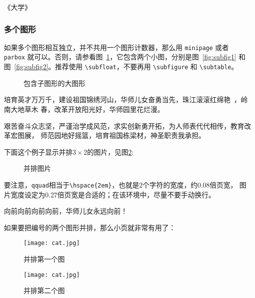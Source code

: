 \hfill \pozhehao《大学》

\subsubsection{多个图形}
\label{sec:multifig}

如果多个图形相互独立，并不共用一个图形计数器，那么用 \verb|minipage| 或者
\verb|parbox| 就可以。否则，请参看图~\ref{fig:big1}，它包含两个小图，分别是图~\ref{fig:subfig1} 
和图~\ref{fig:subfig2}。推荐使用 \verb|\subfloat|，不要再用
\verb|\subfigure| 和 \verb|\subtable|。
\begin{figure}[htb]
  \centering%
  \hspace{4em}%
  \caption{包含子图形的大图形}
  \label{fig:big1}
\end{figure}

培育英才万万千，建设祖国锦绣河山，华师儿女奋勇当先，珠江滚滚红绵艳~，岭南大地草木
春，改革开放阳光好，华师园里花烂漫。

艰苦奋斗众志坚，严谨治学成风范，求实创新勇开拓，为人师表代代相传，教育改革宏图展，
师范园地好摇篮，培育祖国栋梁材，神圣职责我承担。


下面这个例子显示并排$3\times2$的图片，见图\ref{fig:subfig:3x2}:
\begin{figure}[htb]
\centering
{} \qquad
{} \qquad
{} \qquad
{} \qquad
{} \qquad
{}
\caption{并排图片}
\label{fig:subfig:3x2}
\end{figure}

要注意，\texttt{qquad}相当于\verb|\hspace{2em}|，也就是2个字符的宽度，约0.08倍页宽，
图片宽度设定为0.27倍页宽是合适的；在该环境中，尽量不要手动换行。

向前向前向前向前，华师儿女永远向前！

如果要把编号的两个图形并排，那么小页就非常有用了：
\begin{figure}[htb]
\begin{minipage}{0.48\textwidth}
  \centering
  \texttt{[image: cat.jpg]}
  \caption{并排第一个图}
  \label{fig:parallel1}
\end{minipage}\hfill
\begin{minipage}{0.48\textwidth}
  \centering
  \texttt{[image: cat.jpg]}
  \caption{并排第二个图}
  \label{fig:parallel2}
\end{minipage}
\end{figure}

